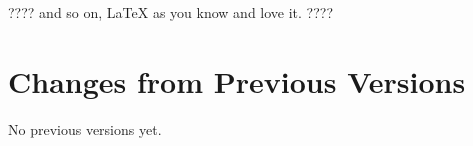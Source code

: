 \documentclass[11pt,a4paper]{ivoa}
\begin{document}

???? and so on, LaTeX as you know and love it. ????

\appendix
\section{Changes from Previous Versions}

No previous versions yet.



\end{document}

